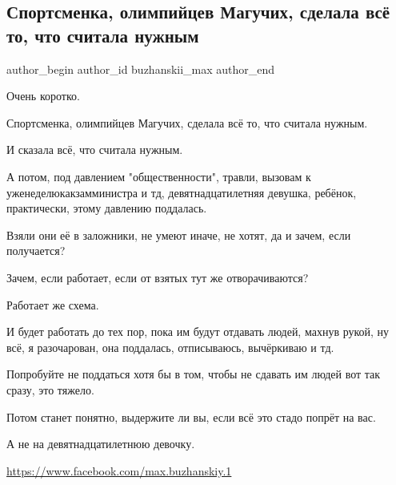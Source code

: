  
 
 
 
 
 
\subsection{Спортсменка, олимпийцев Магучих, сделала всё то, что считала нужным}
\label{sec:12_08_2021.fb.buzhanskii_max.1.maguchih}
 
\ifcmt
 author_begin
   author_id buzhanskii_max
 author_end
\fi

Очень коротко.

Спортсменка, олимпийцев Магучих, сделала всё то, что считала нужным.

И сказала всё, что считала нужным.

А потом, под давлением "общественности", травли, вызовам к
уженеделюкакзамминистра и тд, девятнадцатилетняя девушка, ребёнок, практически,
этому давлению поддалась.

Взяли они её в заложники, не умеют иначе, не хотят, да и зачем, если
получается?

Зачем, если работает, если от взятых тут же отворачиваются?

Работает же схема.

И будет работать до тех пор, пока им будут отдавать людей, махнув рукой, ну
всё, я разочарован, она поддалась, отписываюсь, вычёркиваю и тд.

Попробуйте не поддаться хотя бы в том, чтобы не сдавать им людей вот так сразу,
это тяжело.

Потом  станет понятно, выдержите ли вы, если всё это стадо попрёт на вас.

А не на девятнадцатилетнюю девочку.

\url{https://www.facebook.com/max.buzhanskiy.1}

